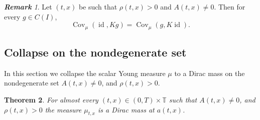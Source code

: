 \documentclass[a4paper,twosided,11pt]{article}
\newcommand{\T}{\mathbb{T}}
\newcommand{\1}{\mathbf{1}}
\DeclareMathOperator*{\Cov}{\operatorname{Cov}}
\theoremstyle{plain}
\newtheorem{thm}{Theorem}[section]
\theoremstyle{remark}
\newtheorem{remark}[thm]{\bf Remark}
\numberwithin{equation}{section}
\begin{document}
\begin{remark}
\label{thm:commutator-extension}
Let $(t,x)$ be such that $\rho(t,x)>0$ and $A(t,x)\neq 0$. Then for every $g\in C(I)$,
\begin{equation}
\label{eq:one-sided-commutator}
 \Cov_{\mu}(\operatorname{id},Kg)=\Cov_{\mu}(g,K\operatorname{id}).
\end{equation}
\end{remark}
\fi

\subsection{Collapse on the nondegenerate set}
\label{sec:collapse}
In this section we collapse the scalar Young measure $\mu$ to a Dirac mass on the nondegenerate set $A(t,x)\neq0$, and $\rho(t,x)>0$.

\begin{thm}
\label{thm:collapse}
For almost every $(t,x)\in(0,T)\times\T$ such that $A(t,x)\neq0$, and $\rho(t,x)>0$ the measure $\mu_{t,x}$ is a Dirac mass at $a(t,x)$.
\end{thm}
\end{document}
